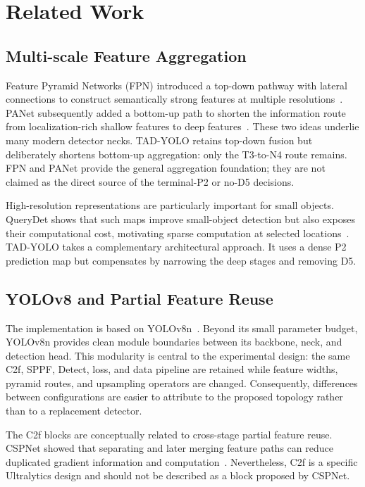 \documentclass[conference]{IEEEtran}
\begin{document}
\section{Related Work}
\subsection{Multi-scale Feature Aggregation}
Feature Pyramid Networks (FPN) introduced a top-down pathway with lateral
connections to construct semantically strong features at multiple
resolutions~\cite{lin2017fpn}.  PANet subsequently added a bottom-up path to
shorten the information route from localization-rich shallow features to deep
features~\cite{liu2018panet}.  These two ideas underlie many modern detector
necks.  TAD-YOLO retains top-down fusion but deliberately shortens bottom-up
aggregation: only the T3-to-N4 route remains.  FPN and PANet provide the
general aggregation foundation; they are not claimed as the direct source of
the terminal-P2 or no-D5 decisions.

High-resolution representations are particularly important for small
objects.  QueryDet shows that such maps improve small-object detection but
also exposes their computational cost, motivating sparse computation at
selected locations~\cite{yang2022querydet}.  TAD-YOLO takes a complementary
architectural approach.  It uses a dense P2 prediction map but compensates by
narrowing the deep stages and removing D5.

\subsection{YOLOv8 and Partial Feature Reuse}
The implementation is based on YOLOv8n~\cite{jocher2023yolov8}.  Beyond its
small parameter budget, YOLOv8n provides clean module boundaries between its
backbone, neck, and detection head.  This modularity is central to the
experimental design: the same C2f, SPPF, Detect, loss, and data pipeline are
retained while feature widths, pyramid routes, and upsampling operators are
changed.  Consequently, differences between configurations are easier to
attribute to the proposed topology rather than to a replacement detector.

The C2f blocks are conceptually related to cross-stage partial feature reuse.
CSPNet showed that separating and later merging feature paths can reduce
duplicated gradient information and computation~\cite{wang2020cspnet}.
Nevertheless, C2f is a specific Ultralytics design and should not be described
as a block proposed by CSPNet.
\end{document}
